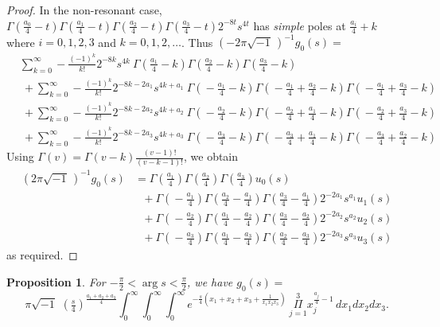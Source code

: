\documentclass[a4paper,12pt,leqno]{amsart}
\numberwithin{equation}{section}
\theoremstyle{plain}
\newtheorem{proposition}[theorem]{Proposition}
\theoremstyle{definition}
\newcommand{\Ga}{\Gamma}
\DeclareMathOperator{\argu}{arg}
\newcommand{\ii}{ {\scriptstyle\sqrt{-1}}\, }
\begin{document}
\begin{proof}
In the non-resonant case,  $\Ga(\tfrac {a_0}4 - t)\Ga(\tfrac {a_1}4 - t)\Ga(\tfrac {a_2}4 - t)\Ga(\tfrac {a_3}4 - t) 2^{-8t} s^{4t}$ has {\em simple} poles at $\frac{a_i}{4}+k$ where $i=0,1,2,3$ and $k=0,1,2,\dots$.  Thus $(-2\pi\ii)^{-1}g_0(s)=$
\begin{align*}
&
\sum_{k=0}^\infty - \tfrac{(-1)^k}{k!} 2^{-8k} s^{4k} 
\ \Ga(\tfrac{a_1}{4}\!-\!k)\Ga(\tfrac{a_2}{4}\!-\!k)\Ga(\tfrac{a_3}{4}\!-\!k)
\\
&\  +
\sum_{k=0}^\infty - \tfrac{(-1)^k}{k!} 2^{-8k-2a_1} s^{4k+a_1} 
\ \Ga(\!-\tfrac{a_1}{4}\!-\!k)\Ga(\!-\tfrac{a_1}{4}\!+\!\tfrac{a_2}{4}\!-\!k)\Ga(\!-\tfrac{a_1}{4}\!+\!\tfrac{a_3}{4}\!-\!k)
\\
&\  +
\sum_{k=0}^\infty - \tfrac{(-1)^k}{k!} 2^{-8k-2a_2} s^{4k+a_2} 
\ \Ga(\!-\tfrac{a_2}{4}\!-\!k)\Ga(\!-\tfrac{a_2}{4}\!+\!\tfrac{a_1}{4}\!-\!k)\Ga(\!-\tfrac{a_2}{4}\!+\!\tfrac{a_3}{4}\!-\!k)
\\
&\ +
\sum_{k=0}^\infty - \tfrac{(-1)^k}{k!} 2^{-8k-2a_3} s^{4k+a_3} 
\ \Ga(\!-\tfrac{a_3}{4}\!-\!k)\Ga(\!-\tfrac{a_3}{4}\!+\!\tfrac{a_1}{4}\!-\!k)\Ga(\!-\tfrac{a_3}{4}\!+\!\tfrac{a_2}{4}\!-\!k)
\end{align*}
Using $\Ga(v)=\Ga(v-k)\frac{(v-1)!}{(v-k-1)!}$, we obtain 
\begin{align*}
(2\pi\ii)^{-1}g_0(s)&=\Ga(\tfrac{a_1}{4})\Ga(\tfrac{a_2}{4})\Ga(\tfrac{a_3}{4})
u_0(s)
\\
&\ \ \ +
\Ga(\!-\tfrac{a_1}{4})\Ga(\tfrac{a_2}{4}\!-\!\tfrac{a_1}{4})\Ga(\tfrac{a_3}{4}\!-\!\tfrac{a_1}{4})
2^{-2a_1}s^{a_1}u_1(s)
\\
&\ \ \ +
\Ga(\!-\tfrac{a_2}{4})\Ga(\tfrac{a_1}{4}\!-\!\tfrac{a_2}{4})\Ga(\tfrac{a_3}{4}\!-\!\tfrac{a_2}{4})
2^{-2a_2}s^{a_2}u_2(s)
\\
&\ \ \ +
\Ga(\!-\tfrac{a_3}{4})\Ga(\tfrac{a_1}{4}\!-\!\tfrac{a_3}{4})\Ga(\tfrac{a_2}{4}\!-\!\tfrac{a_3}{4})
2^{-2a_3}s^{a_3}u_3(s)
\end{align*}
as required.
\end{proof}

\begin{proposition}\label{transform}
For $-\tfrac{\pi}2<\argu s <\tfrac\pi2$, 
we have $g_0(s)=$
\[
\pi\ii
\,
(\tfrac s4)^{\frac{a_1+a_2+a_3}{4}}
\!
\int_{0}^{\infty} \!\!\!\! \int_{0}^{\infty}  \!\!\!\! \int_{0}^{\infty} 
\!\! e^{-\frac s4 \left(   x_1+x_2+x_3 + \frac 1{x_1x_2x_3}\right)   }
\ 
\overset{\scriptscriptstyle 3}{\underset{\scriptstyle j=1}\Pi}
x_j^{ \frac{a_j}4 - 1  } 
\,
dx_1dx_2dx_3.
\]
\end{proposition}
\end{document}
